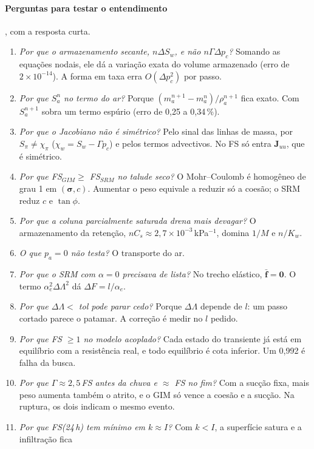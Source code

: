 \paragraph{Perguntas para testar o entendimento}, com a resposta curta.
\begin{enumerate}[label=\textbf{P\arabic*.}, leftmargin=2.2em]
  \item \emph{Por que o armazenamento secante, $n\Delta S_w$, e não $n\Gamma\Delta p_c$?} Somando as equações nodais, ele
    dá a variação exata do volume armazenado (erro de $2\times10^{-14}$). A forma em taxa erra $O(\Delta p_c^2)$ por
    passo.
  \item \emph{Por que $S_a^n$ no termo do ar?} Porque $(m_a^{n+1} - m_a^n)/\rho_a^{n+1}$ fica exato. Com $S_a^{n+1}$
    sobra um termo espúrio (erro de 0,25 a 0,34\,\%).
  \item \emph{Por que o Jacobiano não é simétrico?} Pelo sinal das linhas de massa, por $S_\pi \neq \chi_\pi$
    ($\chi_w = S_w - \Gamma p_c$) e pelos termos advectivos. No FS só entra $\bm J_{uu}$, que é simétrico.
  \item \emph{Por que FS$_{GIM} \geq$ FS$_{SRM}$ no talude seco?} O Mohr--Coulomb é homogêneo de grau 1 em
    $(\bm\sigma, c)$. Aumentar o peso equivale a reduzir só a coesão; o SRM reduz $c$ e $\tan\phi$.
  \item \emph{Por que a coluna parcialmente saturada drena mais devagar?} O armazenamento da retenção,
    $nC_s \approx 2{,}7\times10^{-3}$\,kPa$^{-1}$, domina $1/M$ e $n/K_w$.
  \item \emph{O que $p_a = 0$ não testa?} O transporte do ar.
  \item \emph{Por que o SRM com $\alpha = 0$ precisava de lista?} No trecho elástico, $\bar{\bm f} = \bm 0$. O termo
    $\alpha_e^2\Delta\Lambda^2$ dá $\Delta F = l/\alpha_e$.
  \item \emph{Por que $\Delta\Lambda < $ tol pode parar cedo?} Porque $\Delta\Lambda$ depende de $l$: um passo cortado
    parece o patamar. A correção é medir no $l$ pedido.
  \item \emph{Por que FS $\geq 1$ no modelo acoplado?} Cada estado do transiente já está em equilíbrio com a resistência
    real, e todo equilíbrio é cota inferior. Um 0,992 é falha da busca.
  \item \emph{Por que $\Gamma \approx 2{,}5\,$FS antes da chuva e $\approx$ FS no fim?} Com a sucção fixa, mais peso
    aumenta também o atrito, e o GIM só vence a coesão e a sucção. Na ruptura, os dois indicam o mesmo evento.
  \item \emph{Por que FS(24\,h) tem mínimo em $k \approx I$?} Com $k < I$, a superfície satura e a infiltração fica

\end{enumerate}
